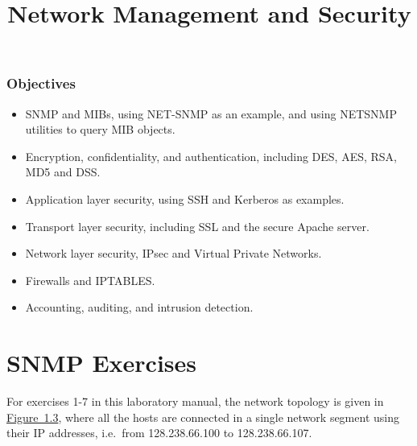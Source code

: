 \documentclass{UTNetLab}
\title{Network Management and Security}
\begin{document}
	\section*{Objectives}
	\begin{itemize}
		\item SNMP and MIBs, using NET-SNMP as an example, and using NETSNMP utilities to query MIB objects.
		\item Encryption, confidentiality, and authentication, including DES, AES, RSA, MD5 and DSS.
		\item Application layer security, using SSH and Kerberos as examples.
		\item Transport layer security, including SSL and the secure Apache server.
		\item Network layer security, IPsec and Virtual Private Networks.
		\item Firewalls and IPTABLES.
		\item Accounting, auditing, and intrusion detection.
	\end{itemize}
\part{SNMP Exercises}
    For exercises 1-7 in this laboratory manual, the network topology is given in \hyperref[fig:1.3]{Figure~1.3}, where all the hosts are connected in a single network segment using their IP addresses, i.e.\  from 128.238.66.100 to 128.238.66.107.
\end{document}
